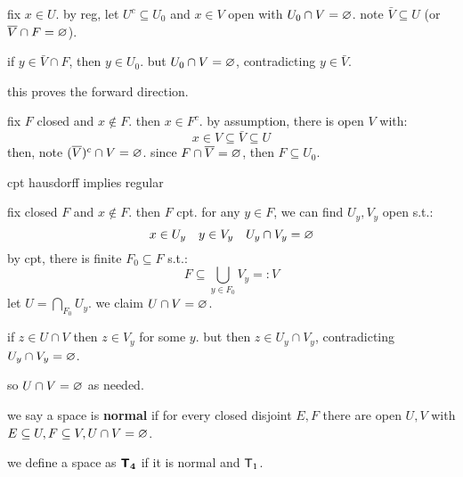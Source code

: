 \begin{pf}[source=Primary Source Material]
    fix $x\in U$.
    by reg, let $U^{c}\subseteq U_{0}$ and $x\in V$ open with
    $U_{0}\cap V=\varnothing$.
    note $\bar{V}\subseteq U$ (or $\overline{V}\cap F=\varnothing$).
    \begin{block}
        if $y\in\bar{V}\cap F$, then $y\in U_{0}$.
        but $U_{0}\cap V=\varnothing$, contradicting $y\in\bar{V}$.
    \end{block}
    this proves the forward direction.

    fix $F$ closed and $x\notin F$. then $x\in F^{c}$.
    by assumption, there is open $V$ with:
    \begin{equation*}
        x\in V\subseteq\bar{V}\subseteq U
    \end{equation*}
    then, note $(\overline{V})^{c}\cap V=\varnothing$.
    since $F\cap\overline{V}=\varnothing$, then $F\subseteq U_{0}$.
\end{pf}

\begin{prop}
    cpt hausdorff implies regular
\end{prop}

\begin{pf}[source=Primary Source Material]
    fix closed $F$ and $x\notin F$. then $F$ cpt.
    for any $y\in F$, we can find $U_{y},V_{y}$ open s.t.:
    \begin{equation*}
        x\in U_{y} \quad y\in V_{y} \quad U_{y}\cap V_{y}=\varnothing
    \end{equation*}
    by cpt, there is finite $F_{0}\subseteq F$ s.t.:
    \begin{equation*}
        F\subseteq \bigcup_{y\in F_{0}}V_{y} =: V
    \end{equation*}
    let $U=\bigcap_{F_{0}}U_{y}$. we claim $U\cap V=\varnothing$.
    \begin{block}
        if $z\in U\cap V$ then $z\in V_{y}$ for some $y$.
        but then $z\in U_{y}\cap V_{y}$, contradicting $U_{y}\cap V_{y}=\varnothing$.
    \end{block}
    so $U\cap V=\varnothing$ as needed.
\end{pf}

\begin{defn}
    we say a space is \textbf{normal} if for every closed disjoint $E,F$ there
    are open $U,V$ with $E\subseteq U,F\subseteq V,U\cap V=\varnothing$.

    we define a space as $\bm{\mathsf{T}_{4}}$ if it is normal and $\mathsf{T}_{1}$.
\end{defn} \

